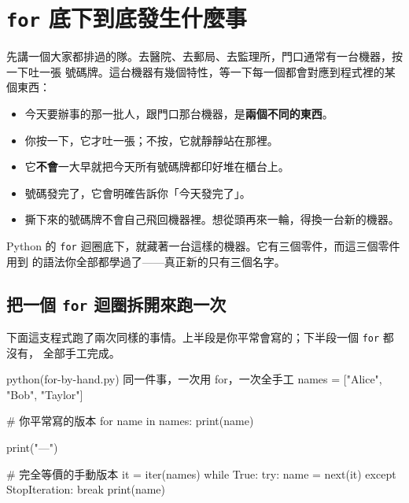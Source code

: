 \section{\texttt{for} 底下到底發生什麼事}
\label{sec:what-for-does}

先講一個大家都排過的隊。去醫院、去郵局、去監理所，門口通常有一台機器，按一下吐一張
號碼牌。這台機器有幾個特性，等一下每一個都會對應到程式裡的某個東西：

\begin{itemize}
\item 今天要辦事的那一批人，跟門口那台機器，是\textbf{兩個不同的東西}。
\item 你按一下，它才吐一張；不按，它就靜靜站在那裡。
\item 它\textbf{不會}一大早就把今天所有號碼牌都印好堆在櫃台上。
\item 號碼發完了，它會明確告訴你「今天發完了」。
\item 撕下來的號碼牌不會自己飛回機器裡。想從頭再來一輪，得換一台新的機器。
\end{itemize}

Python 的 \texttt{for} 迴圈底下，就藏著一台這樣的機器。它有三個零件，而這三個零件用到
的語法你全部都學過了——真正新的只有三個名字。

\subsection*{把一個 \texttt{for} 迴圈拆開來跑一次}

下面這支程式跑了兩次同樣的事情。上半段是你平常會寫的；下半段一個 \texttt{for} 都沒有，
全部手工完成。

\begin{example}{python}{(for-by-hand.py) 同一件事，一次用 for，一次全手工}
names = ["Alice", "Bob", "Taylor"]

# 你平常寫的版本
for name in names:
    print(name)

print("---")

# 完全等價的手動版本
it = iter(names)
while True:
    try:
        name = next(it)
    except StopIteration:
        break
    print(name)
\end{example}



